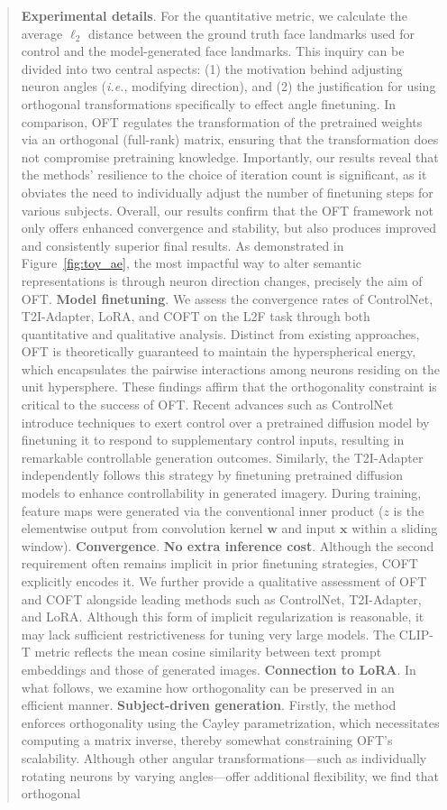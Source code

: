 \begin{abstract}
\begin{itemize}[leftmargin=*,nosep]
\textbf{Experimental details}. For the quantitative metric, we calculate the average $\ell_2$ distance between the ground truth face landmarks used for control and the model-generated face landmarks. This inquiry can be divided into two central aspects: (1) the motivation behind adjusting neuron angles (\emph{i.e.}, modifying direction), and (2) the justification for using orthogonal transformations specifically to effect angle finetuning. In comparison, OFT regulates the transformation of the pretrained weights via an orthogonal (full-rank) matrix, ensuring that the transformation does not compromise pretraining knowledge. Importantly, our results reveal that the methods' resilience to the choice of iteration count is significant, as it obviates the need to individually adjust the number of finetuning steps for various subjects. Overall, our results confirm that the OFT framework not only offers enhanced convergence and stability, but also produces improved and consistently superior final results. As demonstrated in Figure~\ref{fig:toy_ae}, the most impactful way to alter semantic representations is through neuron direction changes, precisely the aim of OFT. \textbf{Model finetuning}. We assess the convergence rates of ControlNet, T2I-Adapter, LoRA, and COFT on the L2F task through both quantitative and qualitative analysis. Distinct from existing approaches, OFT is theoretically guaranteed to maintain the hyperspherical energy, which encapsulates the pairwise interactions among neurons residing on the unit hypersphere. These findings affirm that the orthogonality constraint is critical to the success of OFT. Recent advances such as ControlNet~\cite{zhang2023adding} introduce techniques to exert control over a pretrained diffusion model by finetuning it to respond to supplementary control inputs, resulting in remarkable controllable generation outcomes. Similarly, the T2I-Adapter~\cite{mou2023t2i} independently follows this strategy by finetuning pretrained diffusion models to enhance controllability in generated imagery. During training, feature maps were generated via the conventional inner product ($z$ is the elementwise output from convolution kernel $\bm{w}$ and input $\bm{x}$ within a sliding window). \textbf{Convergence}. \textbf{No extra inference cost}. Although the second requirement often remains implicit in prior finetuning strategies, COFT explicitly encodes it. We further provide a qualitative assessment of OFT and COFT alongside leading methods such as ControlNet, T2I-Adapter, and LoRA. Although this form of implicit regularization is reasonable, it may lack sufficient restrictiveness for tuning very large models. The CLIP-T metric reflects the mean cosine similarity between text prompt embeddings and those of generated images. \textbf{Connection to LoRA}. In what follows, we examine how orthogonality can be preserved in an efficient manner. \textbf{Subject-driven generation}. Firstly, the method enforces orthogonality using the Cayley parametrization, which necessitates computing a matrix inverse, thereby somewhat constraining OFT's scalability. Although other angular transformations—such as individually rotating neurons by varying angles—offer additional flexibility, we find that orthogonal 
\end{itemize}
\end{abstract}
